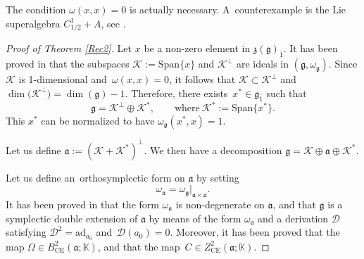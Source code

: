 \documentclass[pdftex]{sigma}
\numberwithin{equation}{section}
\begin{document}
\begin{Remark}[the condition $\omega(x,x)=0$] The condition $\omega(x,x)=0$ is actually necessary. A~counterexample is the Lie superalgebra $C^1_{1/2}+A$, see \cite{BM}.
\end{Remark}

\begin{proof}[Proof of Theorem \ref{Rec2}]
Let $x$ be a non-zero element in $\mathfrak{z}(\mathfrak{g})_{\bar 1}$. It has been proved in \cite{BM} that the subspaces $\mathscr{K}:=\mathrm{Span}\{x\}$ and $\mathscr{K}^\perp$ are ideals in $(\mathfrak{g},\omega_\mathfrak{g})$. Since $\mathscr{K}$ is 1-dimensional and~$\omega(x,x)=0$, it follows that $\mathscr{K}\subset \mathscr{K}^\perp$ and $\dim\bigl(\mathscr{K}^\perp\bigr)=\dim(\mathfrak{g})-1$. Therefore, there exists~$x^* \in \mathfrak{g}_{\bar 1}$ such that
\[
\mathfrak{g}=\mathscr{K}^\perp\oplus \mathscr{K}^*, \qquad \text{where}\ \mathscr{K}^*:=\mathrm{Span}\{x^*\}.
\]
This $x^*$ can be normalized to have $\omega_\mathfrak{g}(x^*,x)=1$.

Let us define $\mathfrak{a}:=(\mathscr{K} +\mathscr{K}^*)^\perp$. We then have a decomposition $\mathfrak{g}=\mathscr{K} \oplus \mathfrak{a} \oplus \mathscr{K}^*$.

Let us define an~orthosymplectic form on $\mathfrak{a}$ by setting
\[
\omega_\mathfrak{a}={\omega_\mathfrak{g}}\vert_{\mathfrak{a}\times \mathfrak{a}}.
\]
It has been proved in \cite{BM} that the form $\omega_\mathfrak{a}$ is non-degenerate on $\mathfrak{a}$, and that $\mathfrak{g}$ is a symplectic double extension of $\mathfrak{a}$ by means of the form $\omega_\mathfrak{a}$ and a derivation ${\mathscr D}$ satisfying ${\mathscr D}^2=\mathrm{ad}_{a_0}$ and~${\mathscr D}(a_0)=0$. Moreover, it has been proved that the map $\Omega\in B^2_{\text{CE}}(\mathfrak{a}; \mathbb{K})$, and that the map~$C\in Z^2_{\text{CE}}(\mathfrak{a}; \mathbb{K})$.


\end{proof}
\end{document}
